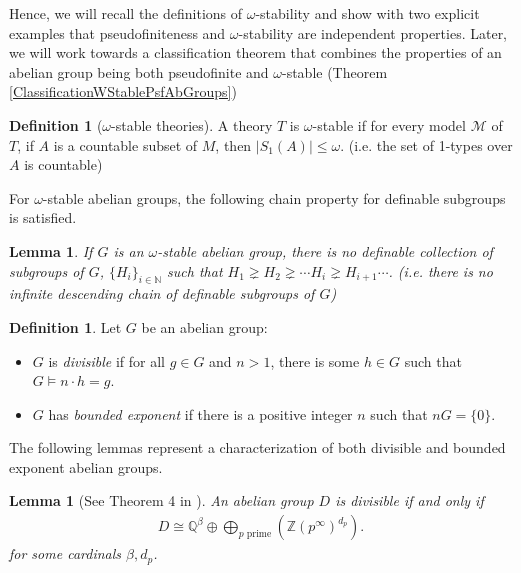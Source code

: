 \documentclass[10pt,a4paper]{amsart}
\newtheorem{lema}[prop]{Lemma}
\theoremstyle{definition}
\newtheorem{definicion}[prop]{Definition}
\newcommand{\bd}{\begin{definicion}}
\newcommand{\ed}{\end{definicion}}
\newcommand{\bl}{\begin{lema}}
\newcommand{\el}{\end{lema}}
\begin{document}
Hence, we will recall the definitions of $\omega$-stability and show with two explicit examples that pseudofiniteness and $\omega$-stability are independent properties. Later, we will work towards a classification theorem that combines the properties of an abelian group being both pseudofinite and $\omega$-stable (Theorem \ref{ClassificationWStablePsfAbGroups})
\bd[$\omega$-stable theories] A theory $T$ is $\omega$-stable if for every model $\mathcal{M}$ of $T$, if $A$ is a countable subset of $M$, then $|S_1(A)|\leq\omega$. (i.e. the set of 1-types over $A$ is countable) 
\ed
For $\omega$-stable abelian groups, the following chain property for definable subgroups is satisfied.
\bl If $G$ is an $\omega$-stable abelian group, there is no definable collection of subgroups of $G$, $\{H_{i}\}_{i\in\mathbb{N}}$ such that $H_{1}\gneq H_{2}\gneq\cdots H_{i}\gneq H_{i+1}\cdots$. (i.e. there is no infinite descending chain of definable subgroups of $G$)
\label{CadenasDescenInfinitas}
\el
\bd Let $G$ be an abelian group:
\begin{itemize}
    \item $G$ is \textit{divisible} if for all $g\in G$ and $n>1$, there is some $h\in G$ such that $G\models n\cdot h=g$.
    \item $G$ has \textit{bounded exponent} if there is a positive integer $n$ such that $nG = \{0\}$.
\end{itemize}
\ed

The following lemmas represent a characterization of both divisible and bounded exponent abelian groups.
\bl[See Theorem 4 in \cite{kaplansky2018infinite}] An abelian group $D$ is divisible if and only if
\begin{align*}
    D\cong\mathbb{Q}^{\beta}\oplus\bigoplus\limits_{p \text{ prime}}(\mathbb{Z}(p^{\infty})^{d_{p}}).
\end{align*}
for some cardinals $\beta,d_{p}$.
\label{IsomorAbelianosDivisibles}
\el
\end{document}
